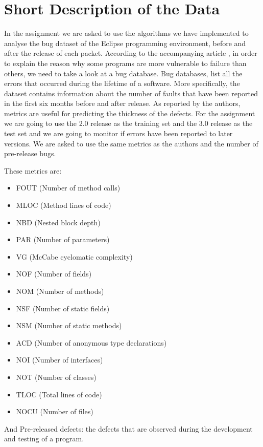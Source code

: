 \documentclass[a4paper,11pt]{article}
\begin{document}
\section{Short Description of the Data}
  In the assignment we are asked to use the algorithms we have implemented to analyse the bug dataset of the Eclipse programming environment, before and after the release of each packet. According to the accompanying article \cite{article}, in order to explain the reason why some programs are more vulnerable to failure than others, we need to take a look at a bug database. Bug databases, list all the errors that occurred during the lifetime of a software. More specifically, the dataset contains information about the number of faults that have been reported in the first six months before and after release. As reported by the authors, metrics are useful for predicting the thickness of the defects. For the assignment we are going to use the 2.0 release as the training set and the 3.0 release as the test set and we are going to monitor if errors have been reported to later versions. We are asked to use the same metrics as the authors and the number of pre-release bugs. 
 
 These metrics are: 
 \begin{itemize}
 \item FOUT      (Number of method calls) 
 \item MLOC     (Method lines of code)
 \item NBD        (Nested block depth)
 \item PAR        (Number of parameters) 
 \item VG          (McCabe cyclomatic complexity)
 \item NOF        (Number of fields)
 \item NOM       (Number of methods) 
 \item NSF        (Number of static fields)
 \item NSM       (Number of static methods)
 \item ACD       (Number of anonymous type declarations)
 \item NOI        (Number of interfaces)
 \item NOT       (Number of classes)
 \item TLOC     (Total lines of code)
 \item NOCU    (Number of files)
 \end{itemize}
And Pre-released defects: the defects that are observed during the development and testing of a program. 
\end{document}
